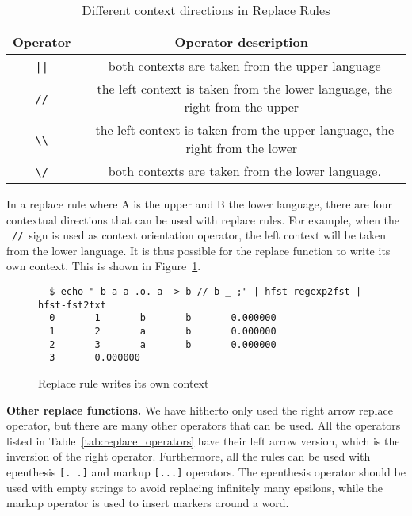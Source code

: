 \documentclass[draft]{llncs}
\begin{document}
\begin{table} [h!]
  \centering
  \caption{Different context directions in Replace Rules}
  \begin{tabular}{ c c }
    \hline
    Operator & Operator description \\ \hline
    \ \verb!||!\ & \ both contexts are taken from the upper language \\ 
    \ \verb!//!\ & \ the left context is taken from the lower language, the right from the upper \\ 
    \ \verb!\\!\ & \ the left context is taken from the upper language, the right from the lower \\ 
    \ \verb!\/!\ & \ both contexts are taken from the lower language. \\ \hline
  \end{tabular}
  \label{tab:context_directions}
\end{table}

In a replace rule where A is the upper and B the lower language, 
there are four contextual directions that can be used with replace rules.
For example, when the \ \verb!//!\ sign is used as context orientation operator, 
the left context will be taken from the lower language. 
It is thus possible for the replace function to write its own context. 
This is shown in Figure~\ref{fig:context_orientation}. 

\begin{figure} [h!]
{\footnotesize
\begin{verbatim}
  $ echo " b a a .o. a -> b // b _ ;" | hfst-regexp2fst | hfst-fst2txt
  0       1       b       b       0.000000
  1       2       a       b       0.000000
  2       3       a       b       0.000000
  3       0.000000
\end{verbatim}
}
\caption{Replace rule writes its own context}
\label{fig:context_orientation}
\end{figure}


\textbf{Other replace functions.} We have hitherto only used the right arrow replace operator,
but there are many other operators that can be used. 
All the operators listed in Table~\ref{tab:replace_operators} have their left arrow version, 
which is the inversion of the right operator. Furthermore, all the rules can be used 
with epenthesis \verb![. .]! and markup \verb![...]! operators. 
The epenthesis operator should be used with empty strings to avoid replacing infinitely 
many epsilons, while the markup operator is used to insert markers around a word.
\end{document}
